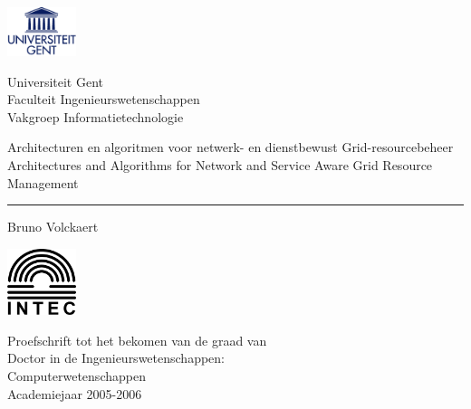 \documentclass[10pt,a4paper,twoside,dutch,english]{book}                %
\begin{document}
\graphicspath{{fig/}}

% 
\thispagestyle{empty}   %
% 
\noindent
\begin{minipage}{3cm}%
  \includegraphics*[width=2cm]{UGentlogo}%
\end{minipage}\hfill
\begin{minipage}{8cm}
  \raggedleft
  \textsf{Universiteit Gent\\
    Faculteit Ingenieurswetenschappen\\
    Vakgroep Informatietechnologie}
\end{minipage}
% 
\bigskip
\begin{flushleft}
  \Large \textsf{Architecturen en algoritmen voor netwerk- en dienstbewust Grid-resourcebeheer}\\
  \vspace{0.1in}\large{\textsf{Architectures and Algorithms for Network and Service Aware Grid Resource Management}}%
\end{flushleft}
\hrule
% 
\bigskip
\LARGE\noindent \textsf{Bruno Volckaert} \hfill
\bigskip
% 
% 
\normalsize
% 
\vfill
\begin{minipage}{2.0cm}%
  \includegraphics*[width=2.0cm]{intec}%
\end{minipage}\hfill
\begin{minipage}{9cm}
  \raggedleft
  \textsf{Proefschrift tot het bekomen van de graad van \\
    Doctor in de Ingenieurswetenschappen: \\
    Computerwetenschappen \\
    Academiejaar 2005-2006}
\end{minipage}
\end{document}
